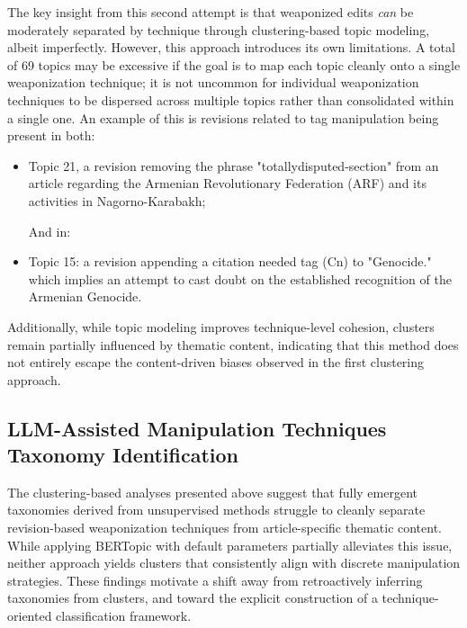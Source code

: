 \documentclass[11pt, a4paper, twoside, openright]{article} %
\begin{document}
The key insight from this second attempt is that weaponized edits \emph{can} be moderately separated by technique through clustering-based topic modeling, albeit imperfectly. However, this approach introduces its own limitations. A total of 69 topics may be excessive if the goal is to map each topic cleanly onto a single weaponization technique; it is not uncommon for individual weaponization techniques to be dispersed across multiple topics rather than consolidated within a single one. An example of this is revisions related to tag manipulation being present in both:
\begin{itemize}
    \item Topic 21, a revision removing the phrase "{{totallydisputed-section}}" from an article regarding the Armenian Revolutionary Federation (ARF) and its activities in Nagorno-Karabakh;
    
    And in:

    \item Topic 15: a revision appending a citation needed tag ({{Cn}}) to "Genocide." which implies an attempt to cast doubt on the established recognition of the Armenian Genocide.
\end{itemize}

Additionally, while topic modeling improves technique-level cohesion, clusters remain partially influenced by thematic content, indicating that this method does not entirely escape the content-driven biases observed in the first clustering approach.



\subsection{LLM-Assisted Manipulation Techniques Taxonomy Identification}

The clustering-based analyses presented above suggest that fully emergent taxonomies derived from unsupervised methods struggle to cleanly separate revision-based weaponization techniques from article-specific thematic content. While applying BERTopic with default parameters partially alleviates this issue, neither approach yields clusters that consistently align with discrete manipulation strategies. These findings motivate a shift away from retroactively inferring taxonomies from clusters, and toward the explicit construction of a technique-oriented classification framework.
\end{document}
